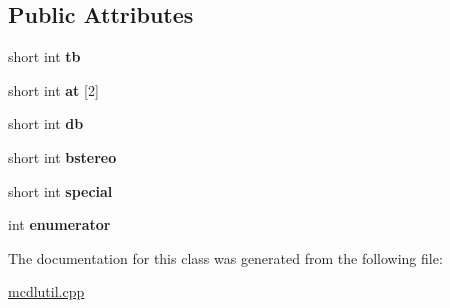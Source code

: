 \subsection*{Public Attributes}
\begin{DoxyCompactItemize}
\item 
\hypertarget{class_open_babel_1_1_t_single_bond_a06f5b2a6e5ce74e7d3ccb890bda91b70}{short int {\bfseries tb}}\label{class_open_babel_1_1_t_single_bond_a06f5b2a6e5ce74e7d3ccb890bda91b70}

\item 
\hypertarget{class_open_babel_1_1_t_single_bond_a63e9421357645c6543623449ff0e01ad}{short int {\bfseries at} \mbox{[}2\mbox{]}}\label{class_open_babel_1_1_t_single_bond_a63e9421357645c6543623449ff0e01ad}

\item 
\hypertarget{class_open_babel_1_1_t_single_bond_acc2cdc6e325e2905675959403bb48cb1}{short int {\bfseries db}}\label{class_open_babel_1_1_t_single_bond_acc2cdc6e325e2905675959403bb48cb1}

\item 
\hypertarget{class_open_babel_1_1_t_single_bond_a5766fffff4190783a3765a2755d9f6b2}{short int {\bfseries bstereo}}\label{class_open_babel_1_1_t_single_bond_a5766fffff4190783a3765a2755d9f6b2}

\item 
\hypertarget{class_open_babel_1_1_t_single_bond_af045655822eb33110fe47c277c92520a}{short int {\bfseries special}}\label{class_open_babel_1_1_t_single_bond_af045655822eb33110fe47c277c92520a}

\item 
\hypertarget{class_open_babel_1_1_t_single_bond_a193e4254cfbd887dff9fb0ee1778c2b8}{int {\bfseries enumerator}}\label{class_open_babel_1_1_t_single_bond_a193e4254cfbd887dff9fb0ee1778c2b8}

\end{DoxyCompactItemize}


The documentation for this class was generated from the following file\-:\begin{DoxyCompactItemize}
\item 
\hyperlink{mcdlutil_8cpp}{mcdlutil.\-cpp}\end{DoxyCompactItemize}
